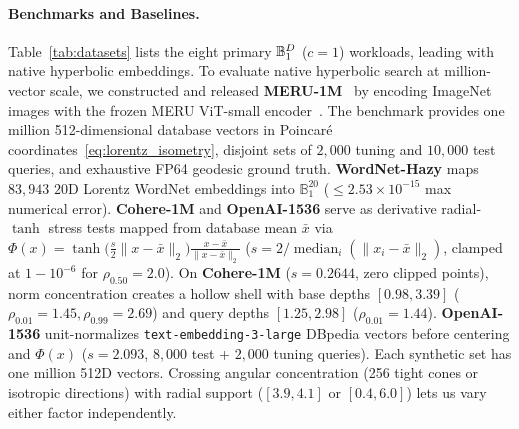 \paragraph{Benchmarks and Baselines.}
Table~\ref{tab:datasets} lists the eight primary $\mathbb{B}_1^D$ ($c=1$) workloads, leading with native hyperbolic embeddings.
To evaluate native hyperbolic search at million-vector scale, we constructed and released \textbf{MERU-1M}~\cite{astrmira2026meruimagenet1m} by encoding {ImageNet} images with the frozen {MERU ViT-small} encoder~\cite{desai2023meru}.
The benchmark provides one million 512-dimensional database vectors in Poincar\'e coordinates~\eqref{eq:lorentz_isometry}, disjoint sets of $2{,}000$ tuning and $10{,}000$ test queries, and exhaustive FP64 geodesic ground truth.
\textbf{WordNet-Hazy} maps $83{,}943$ $20$D {Lorentz} {WordNet} embeddings into $\mathbb{B}_1^{20}$ ($\le 2.53\times 10^{-15}$ max numerical error).
\textbf{Cohere-1M} and \textbf{OpenAI-1536} serve as derivative radial-$\tanh$ stress tests mapped from database mean $\bar{x}$ via $\Phi(x) = \tanh\bigl(\frac{s}{2}\|x - \bar{x}\|_2\bigr)\frac{x - \bar{x}}{\|x - \bar{x}\|_2}$ ($s = 2/\operatorname{median}_i(\|x_i - \bar{x}\|_2)$, clamped at $1 - 10^{-6}$ for $\rho_{0.50} = 2.0$).
On \textbf{Cohere-1M} ($s = 0.2644$, zero clipped points), norm concentration creates a hollow shell with base depths $[0.98, 3.39]$ ($\rho_{0.01}=1.45, \rho_{0.99}=2.69$) and query depths $[1.25, 2.98]$ ($\rho_{0.01}=1.44$).
\textbf{OpenAI-1536} unit-normalizes \texttt{text-embedding-3-large} {DBpedia} vectors before centering and $\Phi(x)$ ($s = 2.093$, $8{,}000$ test + $2{,}000$ tuning queries).
Each synthetic set has one million 512D vectors. Crossing angular concentration (256 tight cones or isotropic directions) with radial support ($[3.9,4.1]$ or $[0.4,6.0]$) lets us vary either factor independently.

